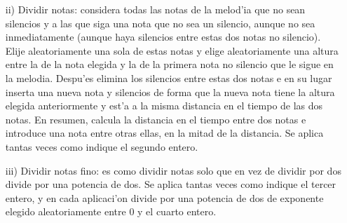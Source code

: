﻿\documentclass[a4paper,12pt]{article}
\begin{document}
\begin{enumerate}
\begin{enumerate}
                \item[ii)] Dividir notas: considera todas las notas de la melod'ia que no sean silencios y a las que siga una nota que no sea un silencio, aunque no sea inmediatamente (aunque haya silencios entre estas dos notas no silencio). Elije aleatoriamente una sola de estas notas y elige aleatoriamente una altura entre la de la nota elegida y la de la primera nota no silencio que le sigue en la melodia. Despu'es elimina los silencios entre estas dos notas e en su lugar inserta una nueva nota y silencios de forma que la nueva nota tiene la altura elegida anteriormente y est'a a la misma distancia en el tiempo de las dos notas. En resumen, calcula la distancia en el tiempo entre dos notas e introduce una nota entre otras ellas, en la mitad de la distancia. Se aplica tantas veces como indique el segundo entero.
                \item[iii)] Dividir notas fino: es como dividir notas solo que en vez de dividir por dos divide por una potencia de dos. Se aplica tantas veces como indique el tercer entero, y en cada aplicaci'on divide por una potencia de dos de exponente elegido aleatoriamente entre 0 y el cuarto entero.
                \end{enumerate}
        \end{enumerate}
\end{document}
